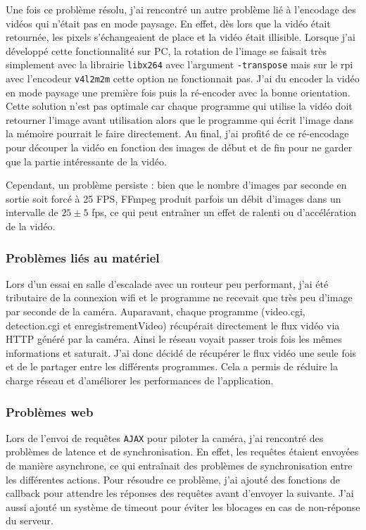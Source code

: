\documentclass[a4paper, 11pt, french]{article}
\begin{document}
Une fois ce problème résolu, j'ai rencontré un autre problème lié à l'encodage des vidéos qui n'était pas en mode paysage. En effet, dès lors que la vidéo était retournée, les pixels s'échangeaient de place et la vidéo était illisible. Lorsque j'ai développé cette fonctionnalité sur PC, la rotation de l'image se faisait très simplement avec la librairie \texttt{libx264} avec l'argument \texttt{-transpose} mais sur le rpi avec l'encodeur \texttt{v4l2m2m} cette option ne fonctionnait pas. J'ai du encoder la vidéo en mode paysage une première fois puis la ré-encoder avec la bonne orientation. Cette solution n'est pas optimale car chaque programme qui utilise la vidéo doit retourner l'image avant utilisation alors que le programme qui écrit l'image dans la mémoire pourrait le faire directement. Au final, j'ai profité de ce ré-encodage pour découper la vidéo en fonction des images de début et de fin pour ne garder que la partie intéressante de la vidéo.

Cependant, un problème persiste : bien que le nombre d'images par seconde en sortie soit forcé à 25 FPS, FFmpeg produit parfois un débit d'images dans un intervalle de \(25\pm 5\) fps, ce qui peut entraîner un effet de ralenti ou d'accélération de la vidéo.

\subsubsection{Problèmes liés au matériel} Lors d'un essai en salle d'escalade avec un routeur peu performant, j'ai été tributaire de la connexion wifi et le programme ne recevait que très peu d'image par seconde de la caméra. Auparavant, chaque programme (video.cgi, detection.cgi et enregistrementVideo) récupérait directement le flux vidéo via HTTP généré par la caméra. Ainsi le réseau voyait passer trois fois les mêmes informations et saturait. J'ai donc décidé de récupérer le flux vidéo une seule fois et de le partager entre les différents programmes. Cela a permis de réduire la charge réseau et d'améliorer les performances de l'application.

\subsubsection{Problèmes web} Lors de l'envoi de requêtes \texttt{AJAX} pour piloter la caméra, j'ai rencontré des problèmes de latence et de synchronisation. En effet, les requêtes étaient envoyées de manière asynchrone, ce qui entraînait des problèmes de synchronisation entre les différentes actions. Pour résoudre ce problème, j'ai ajouté des fonctions de callback pour attendre les réponses des requêtes avant d'envoyer la suivante. J'ai aussi ajouté un système de timeout pour éviter les blocages en cas de non-réponse du serveur.
\end{document}
